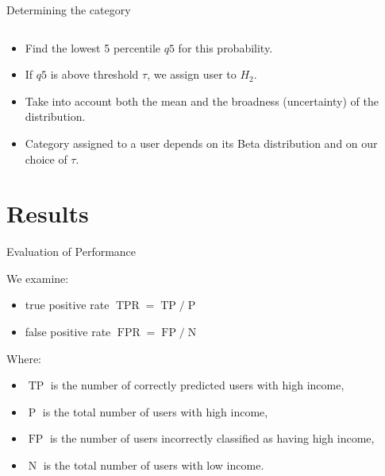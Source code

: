 \documentclass{beamer}
\newcommand{\TP}{\operatorname{TP}}
\newcommand{\FP}{\operatorname{FP}}
\newcommand{\TPR}{\operatorname{TPR}}
\newcommand{\FPR}{\operatorname{FPR}}
\begin{document}
\begin{frame}{Determining the category}
\begin{columns}
\begin{column}{0.49\textwidth}
\end{column}
\end{columns}


\begin{itemize}

\item Find the lowest 5 percentile $q5$ for this probability. 

\item If $q5$ is above threshold $\tau$, we assign user to $H_2$.

\item Take into account both the mean and the broadness (uncertainty) of the distribution. 

\item Category assigned to a user depends on its Beta distribution and on our choice of $\tau$.
\end{itemize}

\end{frame}

\section{Results}

\begin{frame}{Evaluation of Performance}

We examine:
\begin{itemize}
\item true positive rate \( \TPR = \TP / \operatorname{P} \)
\item false positive rate \( \FPR = \FP / \operatorname{N} \)
\end{itemize}
Where:
\begin{itemize}
\item $\TP$ is the number of correctly predicted users with high income,
\item $\operatorname{P}$ is the total number of users with high income, 
\item $\FP$ is the number of users incorrectly classified as having high income,
\item $\operatorname{N}$ is the total number of users with low income.

\end{itemize} 


\end{frame}
\end{document}
